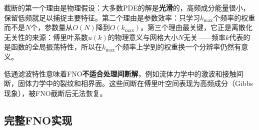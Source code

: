 \begin{remark}[为什么截断高频？]
截断的第一个理由是物理假设：大多数PDE的解是\textbf{光滑}的，高频成分能量很小，保留低频就足以捕捉主要特征。第二个理由是参数效率：只学习$k_{\max}$个频率的权重而不是$N$个，参数量从$O(N)$降到$O(k_{\max})$。第三个理由最关键，它正是离散化无关性的来源：傅里叶系数$\hat{u}(k)$的物理意义与网格大小$N$无关——频率$k$代表的是函数的全局振荡特性，所以在$k_{\max}$个频率上学到的权重换一个分辨率仍然有意义。
\end{remark}

\begin{warning}[title = FNO的局限]
低通滤波特性意味着FNO\textbf{不适合处理间断解}，例如流体力学中的激波和接触间断，固体力学中的裂纹和相界面。这些间断在傅里叶空间表现为高频成分（Gibbs现象），被FNO截断后无法恢复。
\end{warning}

\subsection{完整FNO实现}

